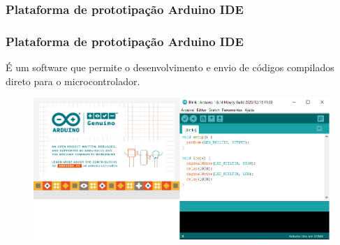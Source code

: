 \subsubsection{Plataforma de prototipação Arduino IDE}

\begin{frame}
\frametitle{Plataforma de prototipação Arduino IDE}

É um software que permite o desenvolvimento e envio de códigos compilados direto para o microcontrolador.

\begin{figure}
\centering
\includegraphics[scale = 0.3]{figuras/idearduino}
\end{figure}

\end{frame}
